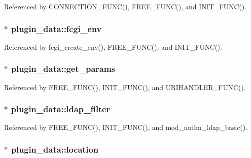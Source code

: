 Referenced by C\-O\-N\-N\-E\-C\-T\-I\-O\-N\-\_\-\-F\-U\-N\-C(), F\-R\-E\-E\-\_\-\-F\-U\-N\-C(), and I\-N\-I\-T\-\_\-\-F\-U\-N\-C().

\hypertarget{structplugin__data_a0831ebaabcf57a4ada05a700389b423e}{
\subsubsection[{fcgi\-\_\-env}]{$\ast$ plugin\-\_\-data\-::fcgi\-\_\-env}}\label{structplugin__data_a0831ebaabcf57a4ada05a700389b423e}


Referenced by fcgi\-\_\-create\-\_\-env(), F\-R\-E\-E\-\_\-\-F\-U\-N\-C(), and I\-N\-I\-T\-\_\-\-F\-U\-N\-C().

\hypertarget{structplugin__data_a8c42372359fe3972148437031eb21301}{
\subsubsection[{get\-\_\-params}]{$\ast$ plugin\-\_\-data\-::get\-\_\-params}}\label{structplugin__data_a8c42372359fe3972148437031eb21301}


Referenced by F\-R\-E\-E\-\_\-\-F\-U\-N\-C(), I\-N\-I\-T\-\_\-\-F\-U\-N\-C(), and U\-R\-I\-H\-A\-N\-D\-L\-E\-R\-\_\-\-F\-U\-N\-C().

\hypertarget{structplugin__data_a062abf92bbdff596dc8fbe59b05a3590}{
\subsubsection[{ldap\-\_\-filter}]{$\ast$ plugin\-\_\-data\-::ldap\-\_\-filter}}\label{structplugin__data_a062abf92bbdff596dc8fbe59b05a3590}


Referenced by F\-R\-E\-E\-\_\-\-F\-U\-N\-C(), I\-N\-I\-T\-\_\-\-F\-U\-N\-C(), and mod\-\_\-authn\-\_\-ldap\-\_\-basic().

\hypertarget{structplugin__data_addc14b397bbdeffaa3743524eb1d0c30}{
\subsubsection[{location}]{$\ast$ plugin\-\_\-data\-::location}}\label{structplugin__data_addc14b397bbdeffaa3743524eb1d0c30}


